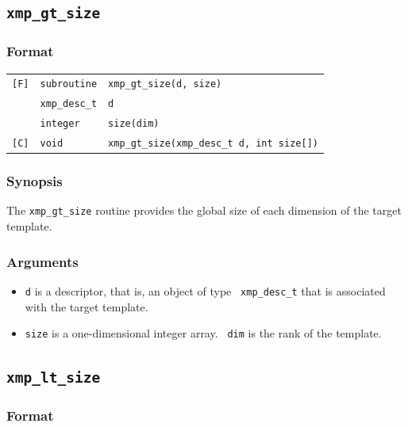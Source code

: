 \subsection{\tt xmp\_gt\_size}

\subsubsection*{Format}

\begin{tabular}{lll}

\verb![F]!& {\tt subroutine}& {\tt xmp\_gt\_size(d, size)}\\
          & {\tt xmp\_desc\_t} & {\tt d}\\
          & {\tt integer} & {\tt size(dim)}\\

\verb![C]!&  {\tt void}& {\tt xmp\_gt\_size(xmp\_desc\_t d, int size[])}\\

\end{tabular}

\subsubsection*{Synopsis}

The {\tt xmp\_gt\_size} routine provides the global size of each
dimension of the target template.

\subsubsection*{Arguments}

\begin{itemize}
 \item {\tt d} is a descriptor, that is, an object of type {\tt
       xmp\_desc\_t} that is associated with the target template.
 \item {\tt size} is a one-dimensional integer array. {\tt
       dim} is the rank of the template.
\end{itemize}

\subsection{\tt xmp\_lt\_size}

\subsubsection*{Format}

